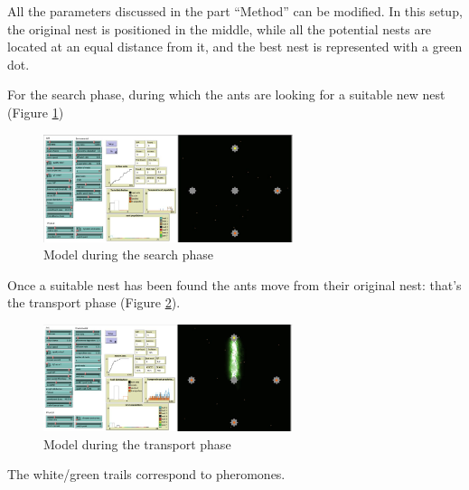 \documentclass{article}
\begin{document}
All the parameters discussed in the part “Method” can be modified.
In this setup, the original nest is positioned in the middle, while all the potential nests are located at an equal distance from it, and the best nest is represented with a green dot. 

For the search phase, during which the ants are looking for a suitable new nest (Figure \ref{fig:b12})
\begin{figure}[h]
    \centering
    \includegraphics[width=0.65\textwidth]{Images/im2.jpeg}
    \caption{Model during the search phase}
    \label{fig:b12}
\end{figure}
Once a suitable nest has been found the ants move from their original nest: that’s the transport phase (Figure \ref{fig:b13}).

\begin{figure}[h]
    \centering
    \includegraphics[width=0.65\textwidth]{Images/im3.jpeg}
    \caption{Model during the transport phase}
    \label{fig:b13}
\end{figure}

The white/green trails correspond to pheromones.
\\
\end{document}
